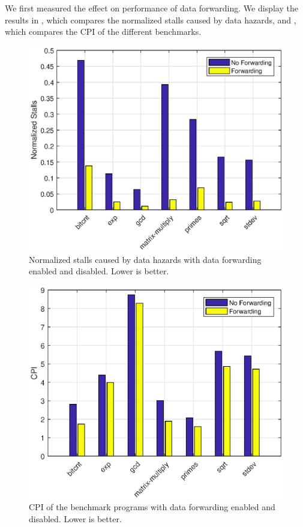 \documentclass[conference,hidelinks]{IEEEtran}
\begin{document}
We first measured the effect on performance of data forwarding. We display the results in , which compares the normalized stalls caused by data hazards, and , which compares the CPI of the different benchmarks.

\begin{figure}[!htb]
  \centering
  \includegraphics[width=0.8\columnwidth]{plots/forwarding_stalls.eps}
  \caption{Normalized stalls caused by data hazards with data forwarding enabled and disabled. Lower is better.}
  \label{fig:fwd_stalls}
\end{figure}

\begin{figure}[!htb]
  \centering
  \includegraphics[width=0.8\columnwidth]{plots/forwarding_cpi.eps}
  \caption{CPI of the benchmark programs with data forwarding enabled and disabled. Lower is better.}
  \label{fig:fwd_cpi}
\end{figure}
\end{document}
